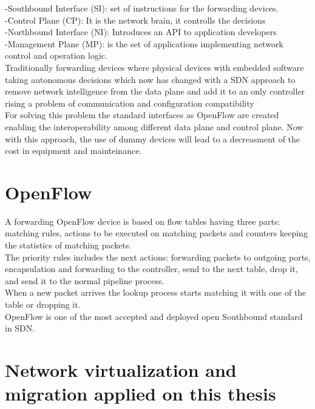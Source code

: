 -Southbound Interface (SI): set of instructions for the forwarding devices.\\
 
-Control Plane (CP): It is the network brain, it controlls the decisions\\
 
-Northbound Interface (NI): Introduces an API to application developers\\
 
-Management Plane (MP): is the set of applications implementing network control and operation logic.\\

Traditionally forwarding devices where physical devices with embedded software taking autonomous decisions which now has changed with a SDN approach to remove network intelligence from the data plane and add it to an only controller rising a problem of communication and configuration compatibility\\

For solving this problem the standard interfaces as OpenFlow are created enabling the interoperability among different data plane and control plane. Now with this approach, the use of dummy devices will lead to a decreasment of  the cost in equipment and mainteinance.\\
 
\section{OpenFlow}
 
A forwarding OpenFlow device is based on flow tables having three parts: matching rules, actions to be executed on matching packets and counters keeping the statistics of matching packets.\\
 
The priority rules includes the next actions: forwarding packets to outgoing ports, encapsulation and forwarding to the controller, send to the next table, drop it, and send it to the normal pipeline process.\\
When a new packet arrives the lookup process starts matching it with one of the table or dropping it.\\

OpenFlow is one of the most accepted and deployed open Southbound standard in SDN.\\

\section{Network virtualization and migration applied on this thesis}

